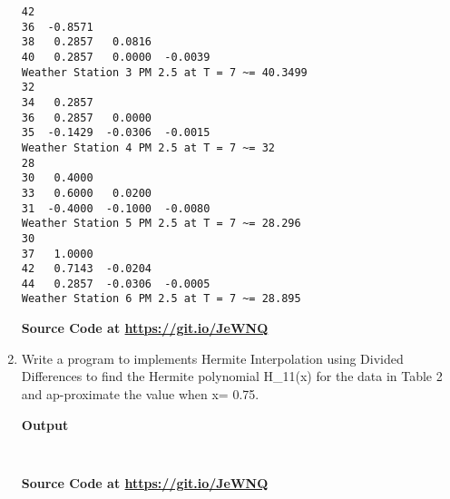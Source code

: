 \documentclass{exam}
\begin{document}
\begin{enumerate}
\begin{verbatim}
42
36  -0.8571
38   0.2857   0.0816
40   0.2857   0.0000  -0.0039
Weather Station 3 PM 2.5 at T = 7 ~= 40.3499
32
34   0.2857
36   0.2857   0.0000
35  -0.1429  -0.0306  -0.0015
Weather Station 4 PM 2.5 at T = 7 ~= 32
28
30   0.4000
33   0.6000   0.0200
31  -0.4000  -0.1000  -0.0080
Weather Station 5 PM 2.5 at T = 7 ~= 28.296
30
37   1.0000
42   0.7143  -0.0204
44   0.2857  -0.0306  -0.0005
Weather Station 6 PM 2.5 at T = 7 ~= 28.895
    \end{verbatim}
    \begin{center}
        \textbf{Source Code at \url{https://git.io/JeWNQ}}
    \end{center}
	\newpage
	\item  Write  a  program  to  implements  Hermite  Interpolation  using  Divided  Differences to find the Hermite polynomial H_{11}(x) for the data in Table 2 and ap-proximate the value when x= 0.75.
    \begin{center}
        \textbf{Output}
    \end{center}
    \begin{verbatim}
	
    \end{verbatim}
    \begin{center}
        \textbf{Source Code at \url{https://git.io/JeWNQ}}
    \end{center}
\end{enumerate}
\newpage
\end{document}
